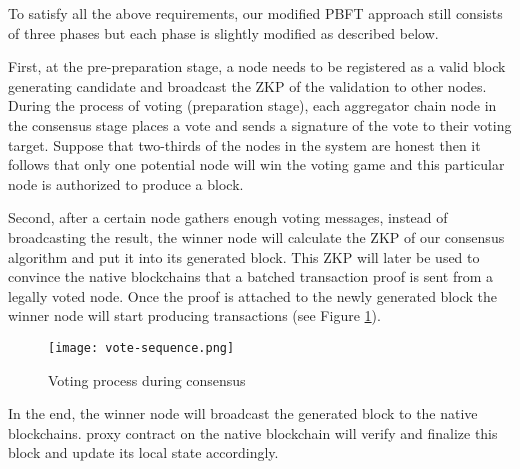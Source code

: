 

To satisfy all the above requirements, our modified PBFT approach still consists of three phases but each phase is slightly modified as described below.

First, at the pre-preparation stage, a node needs to be registered as a valid block generating candidate and broadcast the ZKP of the validation to other nodes. During the process of voting (preparation stage), each aggregator chain node in the consensus stage places a vote and sends a signature of the vote to their voting target. Suppose that two-thirds of the nodes in the system are honest then it follows that only one potential node will win the voting game and this particular node is authorized to produce a block.

Second, after a certain node gathers enough voting messages, instead of broadcasting the result, the winner node will calculate the ZKP of our consensus algorithm and put it into its generated block. This ZKP will later be used to convince the native blockchains that a batched transaction proof is sent from a legally voted node. Once the proof is attached to the newly generated block the winner node will start producing transactions (see Figure \ref{vote-sequence}).

\begin{figure}[!ht]
\begin{center}
\texttt{[image: vote-sequence.png]}
\caption{Voting process during consensus}
\label{vote-sequence}
\end{center}
\end{figure}

In the end, the winner node will broadcast the generated block to the native blockchains. \dprotocol proxy contract on the native blockchain will verify and finalize this block and update its local state accordingly.

